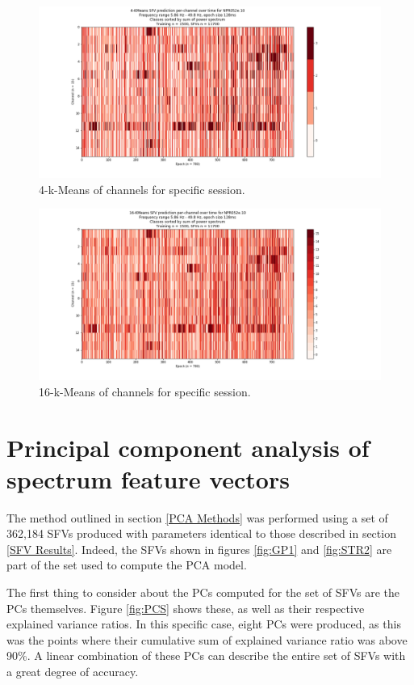 \documentclass{kththesis}
\begin{document}
\begin{figure}[H]
    \centering
    \centerline{\includegraphics[width=1\textwidth]{images/KM4.png}}
    \caption{4-k-Means of channels for specific session.}
    \label{fig:KM4}
\end{figure}

\begin{figure}[H]
    \centering
    \centerline{\includegraphics[width=1\textwidth]{images/KM16.png}}
    \caption{16-k-Means of channels for specific session.}
    \label{fig:KM16}
\end{figure}

\section{Principal component analysis of spectrum feature vectors}\label{PCA Results}

The method outlined in section \ref{PCA Methods} was performed using a set of 362,184 SFVs produced with parameters identical to those described in section \ref{SFV Results}.
Indeed, the SFVs shown in figures \ref{fig:GP1} and \ref{fig:STR2} are part of the set used to compute the PCA model.

The first thing to consider about the PCs computed for the set of SFVs are the PCs themselves.
Figure \ref{fig:PCS} shows these, as well as their respective explained variance ratios. 
In this specific case, eight PCs were produced, as this was the points where their cumulative sum of explained variance ratio was above 90\%.
A linear combination of these PCs can describe the entire set of SFVs with a great degree of accuracy.
\end{document}
